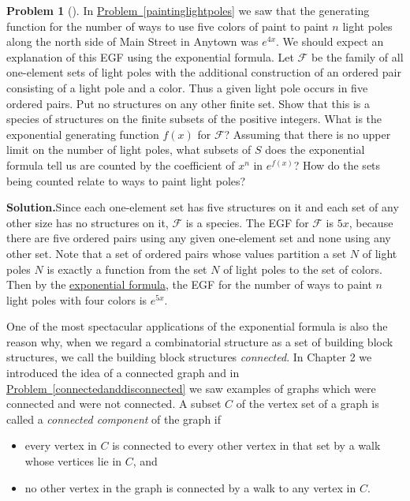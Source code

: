 \documentclass[10pt,]{book}
\theoremstyle{plain}
\theoremstyle{definition}
\newtheorem{activity}[project]{Problem}
\theoremstyle{definition}
\numberwithin{equation}{chapter}
\newcommand{\F}{\mathcal{F}}
\begin{document}
\begin{activity}[]\label{activity-417}
In \hyperref[paintinglightpoles]{Problem~\ref{paintinglightpoles}} we saw that the generating function for the number of ways to use five colors of paint to paint \(n\) light poles along the north side of Main Street in Anytown was \(e^{4x}\). We should expect an explanation of this EGF using the exponential formula. Let \(\F\) be the family of all one-element sets of light poles with the additional construction of an ordered pair consisting of a light pole and a color. Thus a given light pole occurs in five ordered pairs. Put no structures on any other finite set. Show that this is a species of structures on the finite subsets of the positive integers. What is the exponential generating function \(f(x)\) for \(\F\)? Assuming that there is no upper limit on the number of light poles, what subsets of \(S\) does the exponential formula tell us are counted by the coefficient of \(x^n\) in \(e^{f(x)}\)? How do the sets being counted relate to ways to paint light poles?%
\par\medskip\noindent%
\textbf{Solution.}\quad Since each one-element set has five structures on it and each set of any other size has no structures on it, \(\F\) is a species. The EGF for \(\F\) is \(5x\), because there are five ordered pairs using any given one-element set and none using any other set. Note that a set of ordered pairs whose values partition a set \(N\) of light poles \(N\) is exactly a function from the set \(N\) of light poles to the set of colors. Then by the \hyperref[exponentialformulathm]{exponential formula}, the EGF for the number of ways to paint \(n\) light poles with four colors is \(e^{5x}\).%
\end{activity}
One of the most spectacular applications of the exponential formula is also the reason why, when we regard a combinatorial structure as a set of building block structures, we call the building block structures \emph{connected}. In Chapter 2 we introduced the idea of a connected graph and in \hyperref[connectedanddisconnected]{Problem~\ref{connectedanddisconnected}} we saw examples of graphs which were connected and were not connected. A subset \(C\) of the vertex set of a graph is called a \emph{connected component} of the graph if \leavevmode%
\begin{itemize}[label=\textbullet]
\item{}every vertex in \(C\) is connected to every other vertex in that set by a walk whose vertices lie in \(C\), and%
\item{}no other vertex in the graph is connected by a walk to any vertex in \(C\).%
\end{itemize}
\end{document}

